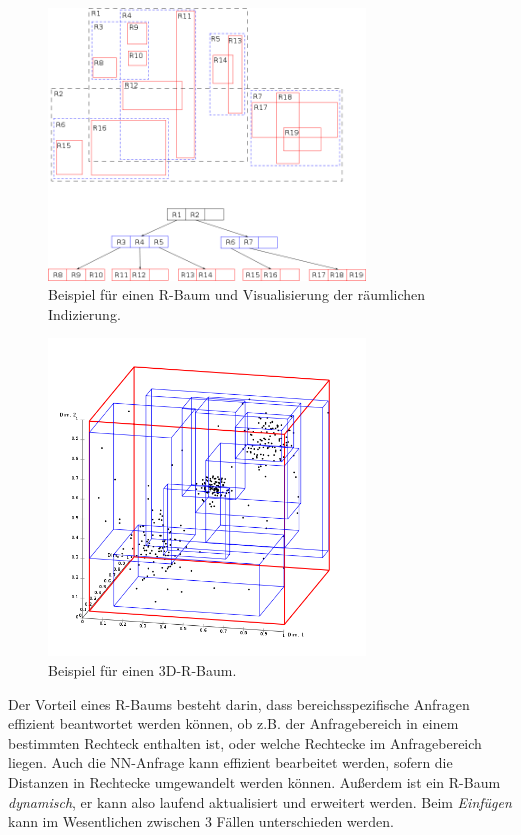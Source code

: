 \begin{figure}[ht]
	\centering
	\includegraphics[width=0.75\textwidth]{Figures/r_tree}
	\caption[R-Baum 2D]{Beispiel für einen R-Baum und Visualisierung der
	räumlichen Indizierung.\footnotemark}
	\label{fig:r_tree}
\end{figure}

\begin{figure}[ht]
	\centering
	\includegraphics[width=0.75\textwidth]{Figures/r_tree3D}
	\caption[R-Baum 3D]{Beispiel für einen 3D-R-Baum.\footnotemark}
	\label{fig:r_tree3D}
\end{figure}

Der Vorteil eines R-Baums besteht darin, dass bereichsspezifische Anfragen effizient
beantwortet werden können, ob z.B. der Anfragebereich in einem bestimmten Rechteck
enthalten ist, oder welche Rechtecke im Anfragebereich liegen. Auch die NN-Anfrage
kann effizient bearbeitet werden,
sofern die Distanzen in Rechtecke umgewandelt werden können.
Außerdem ist ein R-Baum \textit{dynamisch}, er 	kann also laufend
aktualisiert und erweitert werden. Beim \textit{Einfügen} kann im Wesentlichen
zwischen 3 Fällen unterschieden werden. 

